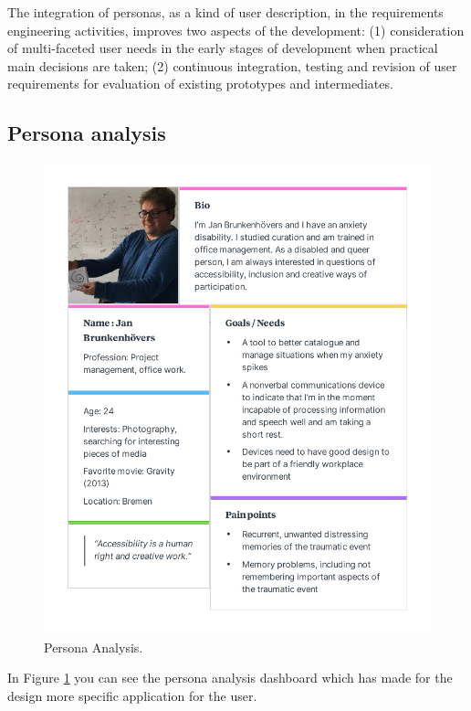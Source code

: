 The integration of personas, as a kind of user description, in the requirements engineering activities, improves two aspects of the development: (1) consideration of multi-faceted user needs in the early stages of development when practical main decisions are taken; (2) continuous integration, testing and revision of user requirements for evaluation of existing prototypes and intermediates.\citep{Mayas2016PersonasChallenges}

\subsection{Persona analysis}
\begin{figure}[hbt!] 
  \centering
  \includegraphics[width=1.05\linewidth]{chap3/image/persona_jans.pdf}
  \caption[Persona Analysis ]{Persona Analysis.}
  \label{fig:Persona_Analysis}
\end{figure}


In Figure \ref{fig:Persona_Analysis} you can see the persona analysis dashboard which has made for the design more specific application for the user.

